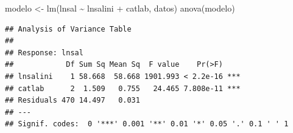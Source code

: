 \documentclass[
]{book}
\newenvironment{Shaded}{\begin{snugshade}}{\end{snugshade}}
\newcommand{\AttributeTok}[1]{\textcolor[rgb]{0.77,0.63,0.00}{#1}}
\newcommand{\DecValTok}[1]{\textcolor[rgb]{0.00,0.00,0.81}{#1}}
\newcommand{\FunctionTok}[1]{\textcolor[rgb]{0.00,0.00,0.00}{#1}}
\newcommand{\NormalTok}[1]{#1}
\newcommand{\OtherTok}[1]{\textcolor[rgb]{0.56,0.35,0.01}{#1}}
\newcommand{\SpecialCharTok}[1]{\textcolor[rgb]{0.00,0.00,0.00}{#1}}
\newcommand{\StringTok}[1]{\textcolor[rgb]{0.31,0.60,0.02}{#1}}
\theoremstyle{break}
\begin{document}
\begin{Shaded}
\begin{Highlighting}[]
\NormalTok{modelo }\OtherTok{\textless{}{-}} \FunctionTok{lm}\NormalTok{(lnsal }\SpecialCharTok{\textasciitilde{}}\NormalTok{ lnsalini }\SpecialCharTok{+}\NormalTok{ catlab, datos)}
\FunctionTok{anova}\NormalTok{(modelo)}
\end{Highlighting}
\end{Shaded}

\begin{verbatim}
## Analysis of Variance Table
## 
## Response: lnsal
##            Df Sum Sq Mean Sq  F value    Pr(>F)    
## lnsalini    1 58.668  58.668 1901.993 < 2.2e-16 ***
## catlab      2  1.509   0.755   24.465 7.808e-11 ***
## Residuals 470 14.497   0.031                       
## ---
## Signif. codes:  0 '***' 0.001 '**' 0.01 '*' 0.05 '.' 0.1 ' ' 1
\end{verbatim}

\begin{Shaded}
\end{Shaded}
\end{document}
